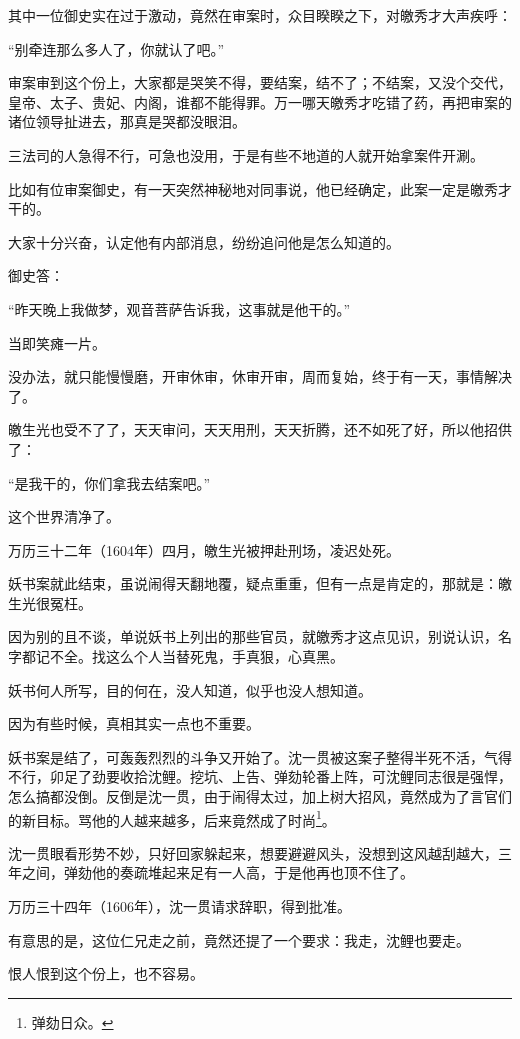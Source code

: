 \begin{multicols}{\theparacolNo}
		其中一位御史实在过于激动，竟然在审案时，众目睽睽之下，对皦秀才大声疾呼：

		“别牵连那么多人了，你就认了吧。”

		审案审到这个份上，大家都是哭笑不得，要结案，结不了；不结案，又没个交代，皇帝、太子、贵妃、内阁，谁都不能得罪。万一哪天皦秀才吃错了药，再把审案的诸位领导扯进去，那真是哭都没眼泪。

		三法司的人急得不行，可急也没用，于是有些不地道的人就开始拿案件开涮。

		比如有位审案御史，有一天突然神秘地对同事说，他已经确定，此案一定是皦秀才干的。

		大家十分兴奋，认定他有内部消息，纷纷追问他是怎么知道的。

		御史答：

		“昨天晚上我做梦，观音菩萨告诉我，这事就是他干的。”

		当即笑瘫一片。

		没办法，就只能慢慢磨，开审休审，休审开审，周而复始，终于有一天，事情解决了。

		皦生光也受不了了，天天审问，天天用刑，天天折腾，还不如死了好，所以他招供了：

		“是我干的，你们拿我去结案吧。”

		这个世界清净了。

		万历三十二年（1604年）四月，皦生光被押赴刑场，凌迟处死。

		妖书案就此结束，虽说闹得天翻地覆，疑点重重，但有一点是肯定的，那就是：皦生光很冤枉。

		因为别的且不谈，单说妖书上列出的那些官员，就皦秀才这点见识，别说认识，名字都记不全。找这么个人当替死鬼，手真狠，心真黑。

		妖书何人所写，目的何在，没人知道，似乎也没人想知道。

		因为有些时候，真相其实一点也不重要。

		妖书案是结了，可轰轰烈烈的斗争又开始了。沈一贯被这案子整得半死不活，气得不行，卯足了劲要收拾沈鲤。挖坑、上告、弹劾轮番上阵，可沈鲤同志很是强悍，怎么搞都没倒。反倒是沈一贯，由于闹得太过，加上树大招风，竟然成为了言官们的新目标。骂他的人越来越多，后来竟然成了时尚\footnote{弹劾日众。}。

		沈一贯眼看形势不妙，只好回家躲起来，想要避避风头，没想到这风越刮越大，三年之间，弹劾他的奏疏堆起来足有一人高，于是他再也顶不住了。

		万历三十四年（1606年），沈一贯请求辞职，得到批准。

		有意思的是，这位仁兄走之前，竟然还提了一个要求：我走，沈鲤也要走。

		恨人恨到这个份上，也不容易。


\end{multicols}
